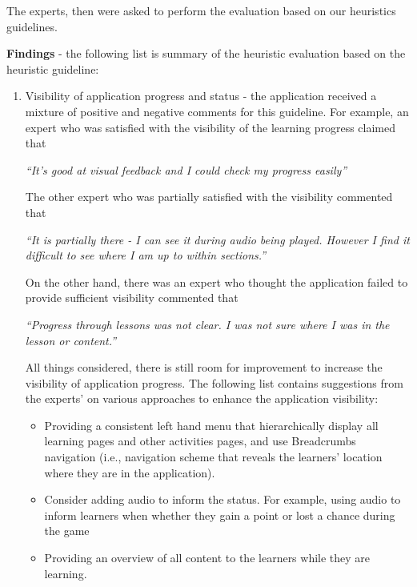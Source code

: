 The experts, then were asked to perform the evaluation based on our heuristics guidelines. 

\textbf{Findings} - the following list is summary of the heuristic evaluation based on the heuristic guideline: 

\begin{enumerate}

\item Visibility of application progress and status - the application received a mixture of positive and negative comments for this guideline. 
For example, an expert who was satisfied with the visibility of the learning progress claimed that
\begin{addmargin}[1.5em]{1.5em}
\textit{``It's good at visual feedback and I could check my progress easily''}\end{addmargin} 

The other expert who was partially satisfied with the visibility commented that 
\begin{addmargin}[1.5em]{1.5em}
\textit{``It is partially there - I can see it during audio being played. However I find it difficult to see where I am up to within sections.''}\end{addmargin} 

On the other hand, there was an expert who thought the application failed to provide sufficient visibility commented that
\begin{addmargin}[1.5em]{1.5em}
\textit{``Progress through lessons was not clear. I was not sure where I was in the lesson or content.''}\end{addmargin} 

All things considered, there is still room for improvement to increase the visibility of application progress. The following list contains suggestions from the experts' on various approaches to enhance the application visibility: 
\begin{itemize}
\item Providing a consistent left hand menu that hierarchically display all learning pages and other activities pages, and use Breadcrumbs navigation (i.e., navigation scheme that reveals the learners' location where they are in the application). 
\item Consider adding audio to inform the status. For example, using audio to inform learners when whether they gain a point or lost a chance during the game
\item Providing an overview of all content to the learners while they are learning. 
\end{itemize}


\end{enumerate}
